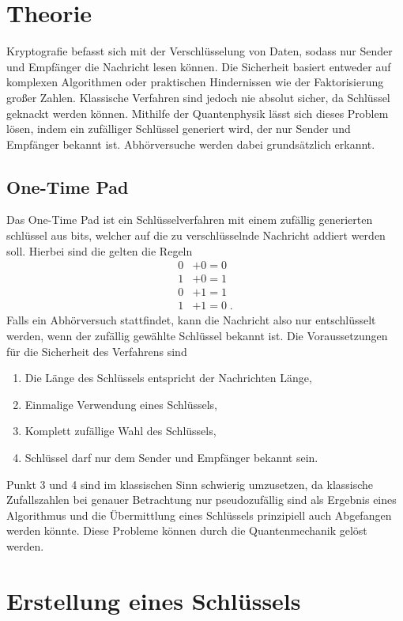\section{Theorie}
Kryptografie befasst sich mit der Verschlüsselung von Daten, sodass nur Sender und Empfänger die Nachricht lesen können. Die Sicherheit basiert entweder auf komplexen Algorithmen oder praktischen Hindernissen wie der Faktorisierung großer Zahlen. Klassische Verfahren sind jedoch nie absolut sicher, da Schlüssel geknackt werden können. Mithilfe der Quantenphysik lässt sich dieses Problem lösen, indem ein zufälliger Schlüssel generiert wird, der nur Sender und Empfänger bekannt ist. Abhörversuche werden dabei grundsätzlich erkannt.

\subsection{One-Time Pad}
Das One-Time Pad ist ein Schlüsselverfahren mit einem zufällig generierten schlüssel aus bits, welcher auf die zu verschlüsselnde Nachricht addiert werden soll.
Hierbei sind die gelten die Regeln
\begin{align*}
    0 &+ 0 =0\\
    1 &+0 =1\\
    0&+1 =1\\
    1&+1=0\; .
\end{align*}
Falls ein Abhörversuch stattfindet, kann die Nachricht also nur entschlüsselt werden, wenn der zufällig gewählte Schlüssel bekannt ist.
Die Voraussetzungen für die Sicherheit des Verfahrens sind 
\begin{enumerate}
    \item Die Länge des Schlüssels entspricht der Nachrichten Länge,
    \item Einmalige Verwendung eines Schlüssels,
    \item Komplett zufällige Wahl des Schlüssels,
    \item Schlüssel darf nur dem Sender und Empfänger bekannt sein.
\end{enumerate}

Punkt 3 und 4 sind im klassischen Sinn schwierig umzusetzen, da klassische Zufallszahlen bei genauer Betrachtung nur pseudozufällig sind als Ergebnis eines Algorithmus und die Übermittlung eines Schlüssels prinzipiell auch Abgefangen werden könnte.
Diese Probleme können durch die Quantenmechanik gelöst werden.

\section{Erstellung eines Schlüssels}
